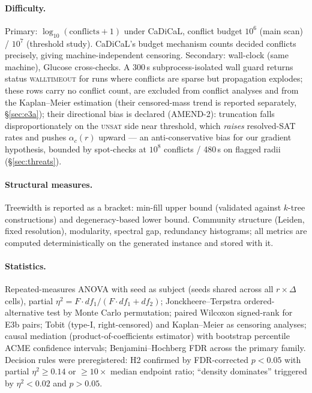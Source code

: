 \documentclass[pdflatex,sn-basic,Numbered]{sn-jnl}
\newcommand{\ac}[1]{\ensuremath{\alpha_c(#1)}}
\begin{document}
\paragraph{Difficulty.}
Primary: $\log_{10}(\text{conflicts}+1)$ under CaDiCaL, conflict budget
$10^6$ (main scan) / $10^7$ (threshold study). CaDiCaL's budget mechanism
counts decided conflicts precisely, giving machine-independent censoring.
Secondary: wall-clock (same machine), Glucose cross-checks. A 300\,s
subprocess-isolated wall guard returns status \textsc{walltimeout} for runs
where conflicts are sparse but propagation explodes; these rows carry no
conflict count, are excluded from conflict analyses and from the
Kaplan--Meier estimation (their censored-mass trend is reported separately,
\S\ref{sec:e3a}); their directional bias is declared (AMEND-2):
truncation falls disproportionately on the \textsc{unsat} side near
threshold, which \emph{raises} resolved-SAT rates and pushes $\ac{r}$ upward
--- an anti-conservative bias for our gradient hypothesis, bounded by
spot-checks at $10^8$ conflicts / 480\,s on flagged radii
(\S\ref{sec:threats}).

\paragraph{Structural measures.}
Treewidth is reported as a bracket: min-fill upper bound (validated against
$k$-tree constructions) and degeneracy-based lower bound. Community structure
(Leiden, fixed resolution), modularity, spectral gap, redundancy histograms;
all metrics are computed deterministically on the generated instance and
stored with it.

\paragraph{Statistics.}
Repeated-measures ANOVA with seed as subject (seeds shared across all
$r\times\Delta$ cells), partial $\eta^2 = F\cdot df_1/(F\cdot df_1+df_2)$;
Jonckheere--Terpstra ordered-alternative test by Monte Carlo permutation;
paired Wilcoxon signed-rank for E3b pairs; Tobit (type-I, right-censored) and
Kaplan--Meier as censoring analyses; \citet{imai2011} causal mediation
(product-of-coefficients estimator) with bootstrap percentile ACME confidence
intervals; Benjamini--Hochberg FDR across the
primary family. Decision rules were preregistered: H2 confirmed by
FDR-corrected $p<0.05$ with partial $\eta^2 \ge 0.14$ or $\ge 10\times$
median endpoint ratio; ``density dominates'' triggered by $\eta^2<0.02$ and
$p>0.05$.
\end{document}
